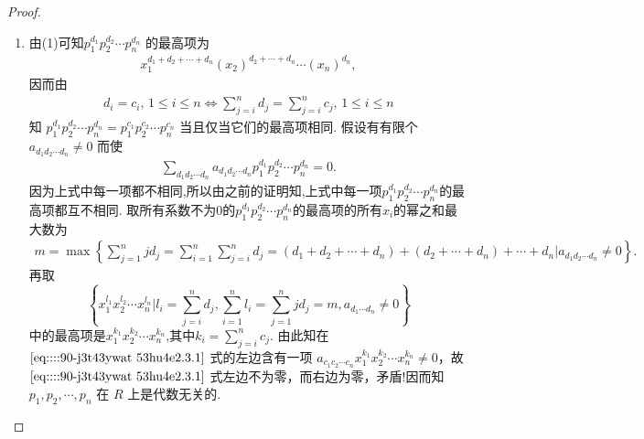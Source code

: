 \documentclass[../../main.tex]{subfiles}%
\begin{document}
\begin{proof}
\begin{enumerate}[(1)]
\item 由(1)可知\( p_1^{d_1} p_2^{d_2} \cdots p_n^{d_n} \) 的最高项为
\begin{align*}
x_1^{d_1 + d_2 + \cdots + d_n} (x_2)^{d_2 + \cdots + d_n} \cdots (x_n)^{d_n},
\end{align*}
因而由
\begin{align*}
d_i = c_i, \, 1 \leqslant i \leqslant n \iff \sum_{j=i}^n d_j = \sum_{j=i}^n c_j, \, 1 \leqslant i \leqslant n
\end{align*}
知 \( p_1^{d_1} p_2^{d_2} \cdots p_n^{d_n} = p_1^{c_1} p_2^{c_2} \cdots p_n^{c_n} \) 当且仅当它们的最高项相同. 假设有有限个\( a_{d_1 d_2 \cdots d_n} \neq 0 \) 而使
\begin{align}
\sum_{d_1 d_2 \cdots d_n} a_{d_1 d_2 \cdots d_n} p_1^{d_1} p_2^{d_2} \cdots p_n^{d_n} = 0. \label{eq::::90-j3t43ywat 53hu4e2.3.1}
\end{align}
因为上式中每一项都不相同,所以由之前的证明知,上式中每一项$p_{1}^{d_1}p_{2}^{d_2}\cdots p_{n}^{d_n}$的最高项都互不相同.
取所有系数不为0的$p_{1}^{d_1}p_{2}^{d_2}\cdots p_{n}^{d_n}$的最高项的所有$x_i$的幂之和最大数为
\begin{align*}
m=\max \left\{ \sum_{j=1}^n{jd_j}=\sum_{i=1}^n{\sum_{j=i}^n{d_j}}=\left( d_1+d_2+\cdots +d_n \right) +\left( d_2+\cdots +d_n \right) +\cdots +d_n\biggl| a_{d_1d_2\cdots d_n}\ne 0 \right\} .
\end{align*}
再取
\[
\left\{ x_1^{l_1} x_2^{l_2} \cdots x_n^{l_n} \bigg| l_i = \sum_{j=i}^n d_j, \sum_{i=1}^n l_i =\sum_{j=1}^n{jd_j}= m ,a_{d_1\cdots d_n}\ne 0\right\}
\]
中的最高项是\( x_1^{k_1} x_2^{k_2} \cdots x_n^{k_n} \),其中\( k_i = \sum_{j=i}^n c_j \).
由此知在 \(\eqref{eq::::90-j3t43ywat 53hu4e2.3.1}\) 式的左边含有一项 \( a_{c_1 c_2 \cdots c_n} x_1^{k_1} x_2^{k_2} \cdots x_n^{k_n}\ne 0 \)，故\(\eqref{eq::::90-j3t43ywat 53hu4e2.3.1}\) 式左边不为零，而右边为零，矛盾!因而知 \( p_1, p_2, \cdots, p_n \) 在 \( R \) 上是代数无关的.
\end{enumerate}

\end{proof}
\end{document}
